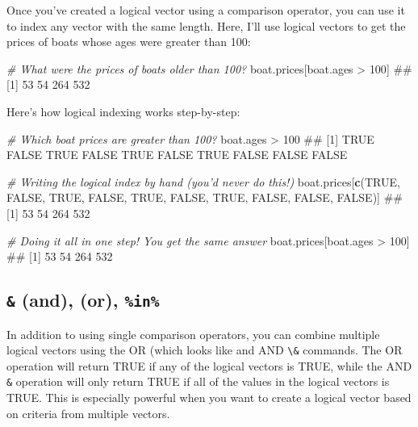 \documentclass[]{book}
\newenvironment{Shaded}{\begin{snugshade}}{\end{snugshade}}
\newcommand{\KeywordTok}[1]{\textcolor[rgb]{0.13,0.29,0.53}{\textbf{{#1}}}}
\newcommand{\DecValTok}[1]{\textcolor[rgb]{0.00,0.00,0.81}{{#1}}}
\newcommand{\StringTok}[1]{\textcolor[rgb]{0.31,0.60,0.02}{{#1}}}
\newcommand{\CommentTok}[1]{\textcolor[rgb]{0.56,0.35,0.01}{\textit{{#1}}}}
\newcommand{\OtherTok}[1]{\textcolor[rgb]{0.56,0.35,0.01}{{#1}}}
\newcommand{\NormalTok}[1]{{#1}}
\theoremstyle{definition}
\theoremstyle{definition}
\theoremstyle{remark}
\begin{document}
Once you've created a logical vector using a comparison operator, you
can use it to index any vector with the same length. Here, I'll use
logical vectors to get the prices of boats whose ages were greater than
100:

\begin{Shaded}
\begin{Highlighting}[]
\CommentTok{# What were the prices of boats older than 100?}
\NormalTok{boat.prices[boat.ages >}\StringTok{ }\DecValTok{100}\NormalTok{]}
\NormalTok{## [1]  53  54 264 532}
\end{Highlighting}
\end{Shaded}

Here's how logical indexing works step-by-step:

\begin{Shaded}
\begin{Highlighting}[]
\CommentTok{# Which boat prices are greater than 100?}
\NormalTok{boat.ages >}\StringTok{ }\DecValTok{100}
\NormalTok{##  [1]  TRUE FALSE  TRUE FALSE  TRUE FALSE  TRUE FALSE FALSE FALSE}

\CommentTok{# Writing the logical index by hand (you'd never do this!)}
\NormalTok{boat.prices[}\KeywordTok{c}\NormalTok{(}\OtherTok{TRUE}\NormalTok{, }\OtherTok{FALSE}\NormalTok{, }\OtherTok{TRUE}\NormalTok{, }\OtherTok{FALSE}\NormalTok{, }\OtherTok{TRUE}\NormalTok{, }\OtherTok{FALSE}\NormalTok{, }\OtherTok{TRUE}\NormalTok{, }\OtherTok{FALSE}\NormalTok{, }\OtherTok{FALSE}\NormalTok{, }\OtherTok{FALSE}\NormalTok{)]}
\NormalTok{## [1]  53  54 264 532}

\CommentTok{# Doing it all in one step! You get the same answer}
\NormalTok{boat.prices[boat.ages >}\StringTok{ }\DecValTok{100}\NormalTok{]}
\NormalTok{## [1]  53  54 264 532}
\end{Highlighting}
\end{Shaded}

\subsection{\texorpdfstring{\texttt{\&} (and), \texttt{\textbar{}} (or),
\texttt{\%in\%}}{\& (and), \textbar{} (or), \%in\%}}\label{and-or-in}

In addition to using single comparison operators, you can combine
multiple logical vectors using the OR (which looks like
\texttt{\textbar{}} and AND \texttt{\textbackslash{}\&} commands. The OR
\texttt{\textbar{}} operation will return TRUE if any of the logical
vectors is TRUE, while the AND \texttt{\&} operation will only return
TRUE if all of the values in the logical vectors is TRUE. This is
especially powerful when you want to create a logical vector based on
criteria from multiple vectors.
\end{document}
